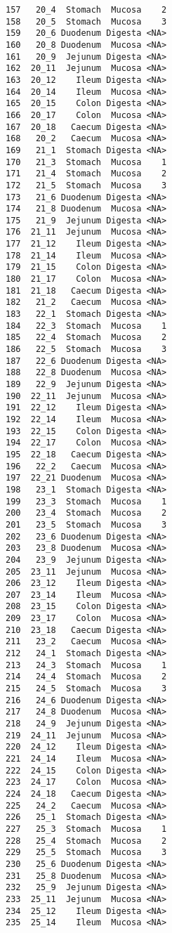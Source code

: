 \documentclass[
  letterpaper,
  DIV=11,
  numbers=noendperiod]{scrartcl}
\begin{document}
\begin{verbatim}
157   20_4  Stomach  Mucosa    2
158   20_5  Stomach  Mucosa    3
159   20_6 Duodenum Digesta <NA>
160   20_8 Duodenum  Mucosa <NA>
161   20_9  Jejunum Digesta <NA>
162  20_11  Jejunum  Mucosa <NA>
163  20_12    Ileum Digesta <NA>
164  20_14    Ileum  Mucosa <NA>
165  20_15    Colon Digesta <NA>
166  20_17    Colon  Mucosa <NA>
167  20_18   Caecum Digesta <NA>
168   20_2   Caecum  Mucosa <NA>
169   21_1  Stomach Digesta <NA>
170   21_3  Stomach  Mucosa    1
171   21_4  Stomach  Mucosa    2
172   21_5  Stomach  Mucosa    3
173   21_6 Duodenum Digesta <NA>
174   21_8 Duodenum  Mucosa <NA>
175   21_9  Jejunum Digesta <NA>
176  21_11  Jejunum  Mucosa <NA>
177  21_12    Ileum Digesta <NA>
178  21_14    Ileum  Mucosa <NA>
179  21_15    Colon Digesta <NA>
180  21_17    Colon  Mucosa <NA>
181  21_18   Caecum Digesta <NA>
182   21_2   Caecum  Mucosa <NA>
183   22_1  Stomach Digesta <NA>
184   22_3  Stomach  Mucosa    1
185   22_4  Stomach  Mucosa    2
186   22_5  Stomach  Mucosa    3
187   22_6 Duodenum Digesta <NA>
188   22_8 Duodenum  Mucosa <NA>
189   22_9  Jejunum Digesta <NA>
190  22_11  Jejunum  Mucosa <NA>
191  22_12    Ileum Digesta <NA>
192  22_14    Ileum  Mucosa <NA>
193  22_15    Colon Digesta <NA>
194  22_17    Colon  Mucosa <NA>
195  22_18   Caecum Digesta <NA>
196   22_2   Caecum  Mucosa <NA>
197  22_21 Duodenum  Mucosa <NA>
198   23_1  Stomach Digesta <NA>
199   23_3  Stomach  Mucosa    1
200   23_4  Stomach  Mucosa    2
201   23_5  Stomach  Mucosa    3
202   23_6 Duodenum Digesta <NA>
203   23_8 Duodenum  Mucosa <NA>
204   23_9  Jejunum Digesta <NA>
205  23_11  Jejunum  Mucosa <NA>
206  23_12    Ileum Digesta <NA>
207  23_14    Ileum  Mucosa <NA>
208  23_15    Colon Digesta <NA>
209  23_17    Colon  Mucosa <NA>
210  23_18   Caecum Digesta <NA>
211   23_2   Caecum  Mucosa <NA>
212   24_1  Stomach Digesta <NA>
213   24_3  Stomach  Mucosa    1
214   24_4  Stomach  Mucosa    2
215   24_5  Stomach  Mucosa    3
216   24_6 Duodenum Digesta <NA>
217   24_8 Duodenum  Mucosa <NA>
218   24_9  Jejunum Digesta <NA>
219  24_11  Jejunum  Mucosa <NA>
220  24_12    Ileum Digesta <NA>
221  24_14    Ileum  Mucosa <NA>
222  24_15    Colon Digesta <NA>
223  24_17    Colon  Mucosa <NA>
224  24_18   Caecum Digesta <NA>
225   24_2   Caecum  Mucosa <NA>
226   25_1  Stomach Digesta <NA>
227   25_3  Stomach  Mucosa    1
228   25_4  Stomach  Mucosa    2
229   25_5  Stomach  Mucosa    3
230   25_6 Duodenum Digesta <NA>
231   25_8 Duodenum  Mucosa <NA>
232   25_9  Jejunum Digesta <NA>
233  25_11  Jejunum  Mucosa <NA>
234  25_12    Ileum Digesta <NA>
235  25_14    Ileum  Mucosa <NA>

\end{verbatim}
\end{document}
